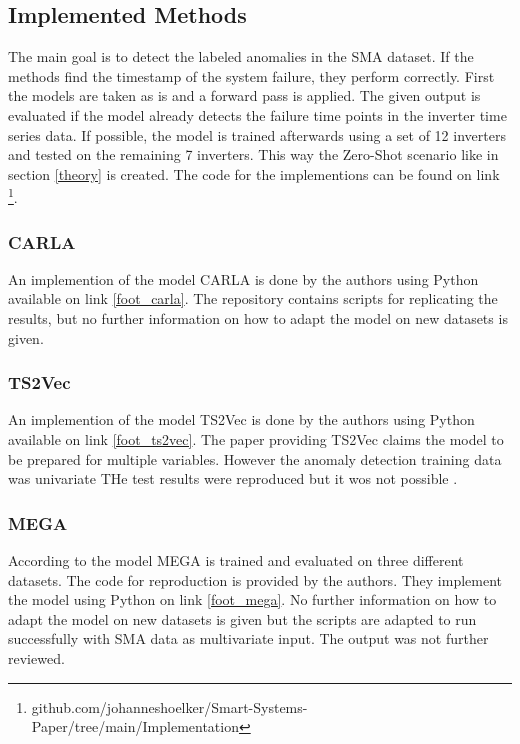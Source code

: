 
\subsection{Implemented Methods}
The main goal is to detect the labeled anomalies in the SMA dataset. If the methods find the timestamp of the system failure, they perform correctly. First the models are taken as is and a forward pass is applied. The given output is evaluated if the model already detects the failure time points in the inverter time series data. If possible, the model is trained afterwards using a set of 12 inverters and tested on the remaining 7 inverters. This way the Zero-Shot scenario like in section \ref{theory} is created.
The code for the implementions can be found on link \footnote{\fussy\tiny github.com/johanneshoelker/Smart-Systems-Paper/tree/main/Implementation}.

\subsubsection{CARLA}
An implemention of the model CARLA is done by the authors using Python available on link \ref{foot_carla}. The repository contains scripts for replicating the results, but no further information on how to adapt the model on new datasets is given.

\subsubsection{TS2Vec}
An implemention of the model TS2Vec is done by the authors using Python available on link \ref{foot_ts2vec}.
The paper providing TS2Vec claims the model to be prepared for multiple variables. However the anomaly detection training data was univariate
THe test results were reproduced but it wos not possible  \cite{yue_ts2vec_2022}.

\subsubsection{MEGA}
According to \cite{wang_multiscale_2023} the model MEGA is trained and evaluated on three different datasets. The code for reproduction is provided by the authors. They implement the model using Python on link \ref{foot_mega}. No further information on how to adapt the model on new datasets is given but the scripts are adapted to run successfully with SMA data as multivariate input. The output was not further reviewed.

